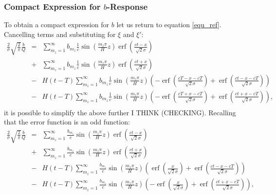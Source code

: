\documentclass[12pt]{article}
\DeclareMathOperator\erf {erf}
\begin{document}
\subsubsection{Compact Expression for $b$-Response}
%
To obtain a compact expression for $b$ let us return to equation \ref{equ_ref}. Cancelling terms and substituting for $\xi$ and $\xi'$:
%
\begin{eqnarray}
 \frac{2}{\sigma} \sqrt{ \frac{2} {\pi}} \frac{b}{Q}  & = &\sum_{m_z = 1}^{\infty} b_{m_z} \frac{1}{c} \sin \left( \frac{m_z \pi} {H} z\right) \erf \left( \frac{ct-x}{\sqrt{2} \sigma} \right)   \\ \nonumber
& + &\sum_{m_z = 1}^{\infty} b_{m_z} \frac{1}{c}  \sin \left( \frac{m_z \pi} {H} z\right) \erf \left( \frac{ct+x }{\sqrt{2} \sigma} \right) \\ \nonumber
& - & H(t-T) \sum_{m_z = 1}^{\infty} b_{m_z} \frac{1}{c} \sin \left( \frac{m_z \pi} {H} z\right) \left( - \erf \left( \frac{cT- x - cT}{\sqrt{2} \sigma} \right) +  \erf \left( \frac{ct-x-cT}{\sqrt{2} \sigma} \right)    \right)  \\ \nonumber
& - & H(t-T)  \sum_{m_z = 1}^{\infty} b_{m_z}  \frac{1}{c} \sin \left( \frac{m_z \pi} {H} z\right) \left( - \erf \left( \frac{cT+x-cT}{\sqrt{2} \sigma} \right) +  \erf \left( \frac{ct +x-cT}{\sqrt{2} \sigma} \right)    \right), \\ \nonumber
\end{eqnarray}
%
it is possible to simplify the above further I THINK (CHECKING). Recalling that the error function is an odd function:
%
\begin{eqnarray}
 \frac{2}{\sigma} \sqrt{ \frac{2} {\pi}} \frac{b}{Q}  & = &\sum_{m_z = 1}^{\infty}\frac{ b_{m_z}}{c}\sin \left( \frac{m_z \pi} {H} z\right) \erf \left( \frac{ct-x}{\sqrt{2} \sigma} \right)   \\ \nonumber
& + &\sum_{m_z = 1}^{\infty} \frac{ b_{m_z}}{c} \sin \left( \frac{m_z \pi} {H} z\right) \erf \left( \frac{ct+x }{\sqrt{2} \sigma} \right) \\ \nonumber
& - & H(t-T) \sum_{m_z = 1}^{\infty} \frac{ b_{m_z}}{c} \sin \left( \frac{m_z \pi} {H} z\right) \left( \erf \left( \frac{ x }{\sqrt{2} \sigma} \right) +  \erf \left( \frac{ct-x-cT}{\sqrt{2} \sigma} \right)    \right)  \\ \nonumber
& - & H(t-T)  \sum_{m_z = 1}^{\infty} \frac{ b_{m_z}}{c} \sin \left( \frac{m_z \pi} {H} z\right) \left( - \erf \left( \frac{x}{\sqrt{2} \sigma} \right) +  \erf \left( \frac{ct +x-cT}{\sqrt{2} \sigma} \right)    \right), \\ \nonumber
\end{eqnarray}
\end{document}
